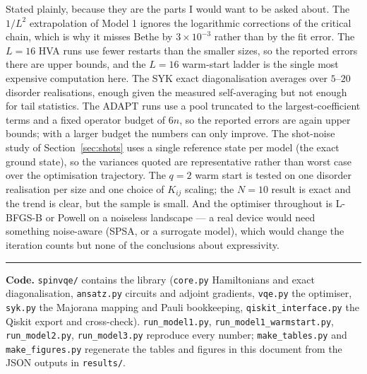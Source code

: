 \documentclass[10pt,a4paper]{article}
\begin{document}
Stated plainly, because they are the parts I would want to be asked about.
The $1/L^2$ extrapolation of Model 1 ignores the logarithmic corrections of the
critical chain, which is why it misses Bethe by $3\times10^{-3}$ rather than
by the fit error. The $L=16$ HVA runs use fewer restarts than the smaller
sizes, so the reported errors there are upper bounds, and the $L=16$ warm-start
ladder is the single most expensive computation here. The SYK exact
diagonalisation averages over $5$--$20$ disorder realisations, enough given the
measured self-averaging but not enough for tail statistics. The ADAPT runs use a pool truncated to the
largest-coefficient terms and a fixed operator budget of $6n$, so the reported
errors are again upper bounds; with a larger budget the numbers can only
improve. The shot-noise study of Section~\ref{sec:shots} uses a single
reference state per model (the exact ground state), so the variances quoted are
representative rather than worst case over the optimisation trajectory. The
$q=2$ warm start is tested on one disorder realisation per size and one choice
of $K_{ij}$ scaling; the $N=10$ result is exact and the trend is clear, but the
sample is small. And the optimiser throughout is L-BFGS-B or Powell on a
noiseless landscape --- a real device would need something noise-aware
(SPSA, or a surrogate model), which would change the iteration counts but none
of the conclusions about expressivity.

\vspace{0.4em}
\hrule
\vspace{0.4em}
\noindent\small
\textbf{Code.} \texttt{spinvqe/} contains the library
(\texttt{core.py} Hamiltonians and exact diagonalisation, \texttt{ansatz.py}
circuits and adjoint gradients, \texttt{vqe.py} the optimiser,
\texttt{syk.py} the Majorana mapping and Pauli bookkeeping,
\texttt{qiskit\_interface.py} the Qiskit export and cross-check).
\texttt{run\_model1.py}, \texttt{run\_model1\_warmstart.py},
\texttt{run\_model2.py}, \texttt{run\_model3.py} reproduce every number;
\texttt{make\_tables.py} and \texttt{make\_figures.py} regenerate the tables
and figures in this document from the JSON outputs in \texttt{results/}.


\end{document}
